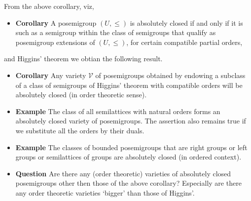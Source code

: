 \documentclass[notes=show]{beamer}
\makeatletter
\newenvironment{stepitemize}{\begin{itemize}[<+->]}{\end{itemize} }
\newenvironment{stepitemizewithalert}{\begin{itemize}[<+-| alert@+>]}{\end{itemize} }
\makeatother
\begin{document}
\begin{frame}%


From the above corollary, viz,

\begin{stepitemizewithalert}
\item \textbf{Corollary} A posemigroup $(U,\leq )$ is absolutely closed if
and only if it is such as a semigroup within the class of semigroups that
qualify as posemigroup extensions of $(U,\leq )$, for certain compatible
partial orders,
\end{stepitemizewithalert}

\qquad and Higgins' theorem we obtian the following result.\bigskip

\begin{stepitemize}
\item \textbf{Corollary} Any variety $\mathcal{V}$ of posemigroups obtained
by endowing a subclass of a class of semigroups of Higgins' theorem with
compatible orders will be absolutely closed (in order theoretic sense).
\end{stepitemize}

\transboxout%
\end{frame}%

\begin{frame}%


\begin{stepitemize}
\item \textbf{Example} The class of all semilattices with natural orders
forms an absolutely closed variety of posemigroups. The assertion also
remains true if we substitute all the orders by their duals.\bigskip 

\item \textbf{Example} The classes of bounded posemigroups that are right
groups or left groups or semilattices of groups are absolutely closed (in
ordered context).\bigskip 

\item \textbf{Question }Are there any (order theoretic) varieties of
absolutely closed posemigroups other then those of the above corollary?
Especially are there any order theoretic varieties `bigger' than those of
Higgins'.
\end{stepitemize}

\transboxout%
\end{frame}%
\end{document}
